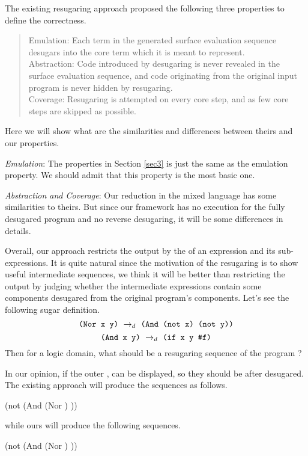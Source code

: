 The existing resugaring approach proposed the following three properties to define the correctness.

\begin{quote}
Emulation: 
Each term in the generated surface evaluation sequence desugars into the core term which it is meant to represent.\\
Abstraction: 
Code introduced by desugaring is never revealed in the surface evaluation sequence, and code originating from the original input program is never hidden by resugaring.\\
Coverage: Resugaring is attempted on every core step, and as few core steps are skipped as possible.\\
\end{quote}
Here we will show what are the similarities and differences between theirs and our properties.

\emph{Emulation}: The properties in Section \ref{sec3} is just the same as the emulation property. We should admit that this property is the most basic one.

\emph{Abstraction and Coverage}: Our reduction in the mixed language has some similarities to theirs. But since our framework has no execution for the fully desugared program and no reverse desugaring, it will be some differences in details.

Overall, our approach restricts the output by the  of an expression and its sub-expressions. It is quite natural since the motivation of the resugaring is to show useful intermediate sequences, we think it will be better than restricting the output by judging whether the intermediate expressions contain some components desugared from the original program's components. Let's see the following sugar definition.
\[
\texttt{(Nor~x~y)} ~\rightarrow_d~ \texttt{(And~(not~x)~(not~y))}
\]
\[
\texttt{(And~x~y)} ~\rightarrow_d~ \texttt{(if~x~y~\#f)}
\]
Then for a logic domain, what should be a resugaring sequence of the program  ?

In our opinion, if the outer ,  can be displayed, so they should be after desugared.
The existing approach will produce the sequences as follows.
\begin{footnotesize}
\begin{Codes}
    (not (And (Nor \false \true) \true))
\OneStep{ \true}
\end{Codes}
\end{footnotesize}
while ours will produce the following sequences.
\begin{footnotesize}
\begin{Codes}
    (not (And (Nor \false \true) \true))
\OneStep{ \true}
\end{Codes}
\end{footnotesize}

